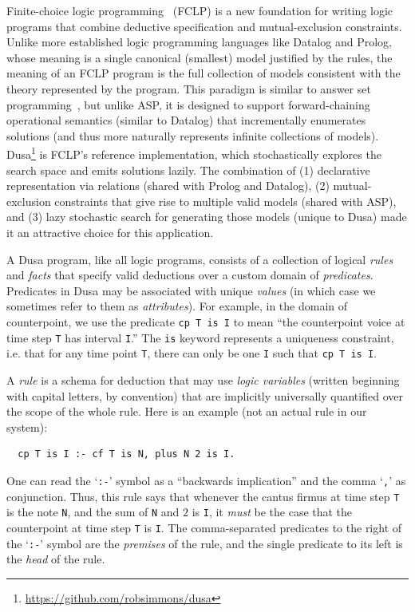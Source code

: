 Finite-choice logic programming~\cite{martens2025finite} (FCLP) is a new
foundation for writing logic programs that combine deductive specification
and mutual-exclusion constraints. Unlike more established logic programming
languages like Datalog and Prolog, whose meaning is a single canonical
(smallest) model justified by the rules, the meaning of an FCLP program is
the full collection of models consistent with the theory represented by the
program.  This paradigm is similar to answer set
programming~\cite{lifschitz2019answer}, but unlike ASP, it is designed to support
forward-chaining operational semantics (similar to Datalog) that
incrementally enumerates solutions (and thus more naturally represents
infinite collections of models). 
Dusa\footnote{\url{https://github.com/robsimmons/dusa}} is FCLP's reference
implementation, which stochastically explores the search space and emits
solutions lazily. The combination of (1) declarative representation via
relations (shared with Prolog and Datalog), (2) mutual-exclusion
constraints that give rise to multiple valid models (shared with ASP), and (3)
lazy stochastic search for generating those models (unique to Dusa) 
made it an attractive choice for this application.

A Dusa program, like all logic programs, consists of a collection
of logical {\em rules} and {\em facts} that specify valid deductions
over a custom domain of {\em predicates}. Predicates in Dusa
may be associated with unique {\em values} (in which case we
sometimes refer to them as {\em attributes}). For example, in
the domain of counterpoint, we use the predicate
\verb|cp T is I| to mean ``the counterpoint voice
at time step \verb|T| has interval \verb|I|.''
The \verb|is| keyword represents a uniqueness constraint, i.e. that for any
time point \verb|T|, there can only be one \verb|I| such that \verb|cp T is I|.

A {\em rule} is a schema for deduction that may use {\em logic variables}
(written beginning with capital letters, by convention) that are implicitly
universally quantified over the scope of the whole rule. Here is an
example (not an actual rule in our system):

\begin{verbatim}
  cp T is I :- cf T is N, plus N 2 is I.
\end{verbatim}

One can read the `\verb|:-|' symbol as a ``backwards implication''
and the comma `\verb|,|' as conjunction. Thus,
this rule says that whenever the cantus firmus at time step \verb|T| is the
note \verb|N|, and the sum of \verb|N| and $2$ is \verb|I|,
it {\em must} be the case that the counterpoint at time step
\verb|T| is \verb|I|. The comma-separated predicates to the right of the
`\verb|:-|' symbol are the {\em premises} of the rule, and the
single predicate to its left is the {\em head} of the rule.

